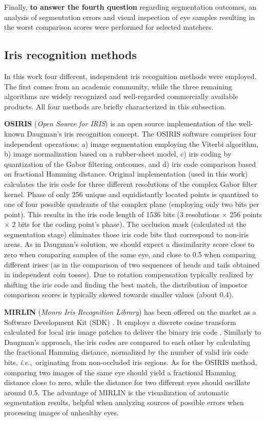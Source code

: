 \documentclass[article,12pt]{elsarticle}
\newcommand{\ie}{{\it i.e.},~}
\begin{document}
Finally, \textbf{to answer the fourth question} regarding segmentation outcomes, an analysis of segmentation errors and visual inspection of eye samples resulting in the worst comparison scores were performed for selected matchers. 


\subsection{Iris recognition methods} 
\label{methods}

In this work four different, independent iris recognition methods were employed. The first comes from an academic community, while the three remaining algorithms are widely recognized and well-regarded commercially available products. All four methods are briefly characterized in this subsection.

\textbf{OSIRIS} ({\it Open Source for IRIS}) \cite{OSIRIS} is an open source implementation of the well-known Daugman’s iris recognition concept. The OSIRIS software comprises four independent operations: a) image segmentation employing the Viterbi algorithm, b) image normalization based on a rubber-sheet model, c) iris coding by quantization of the Gabor filtering outcomes, and d) iris code comparison based on fractional Hamming distance. Original implementation (used in this work) calculates the iris code for three different resolutions of the complex Gabor filter kernel. Phase of only 256 unique and equidistantly located points is quantized to one of four possible quadrants of the complex plane (employing only two bits per point). This results in the iris code length of 1536 bits (3 resolutions $\times$ 256 points $\times$ 2 bits for the coding point’s phase). The occlusion mask (calculated at the segmentation stage) eliminates those iris code bits that correspond to non-iris areas. As in Daugman’s solution, we should expect a dissimilarity score close to zero when comparing samples of the same eye, and close to 0.5 when comparing different irises (as in the comparison of two sequences of heads and tails obtained in independent coin tosses). Due to rotation compensation typically realized by shifting the iris code and finding the best match, the distribution of impostor comparison scores is typically skewed towards smaller values (about 0.4).

\textbf{MIRLIN} ({\it Monro Iris Recognition Library}) has been offered on the market as a Software Development Kit (SDK) \cite{MIRLIN}. It employs a discrete cosine transform calculated for local iris image patches to deliver the binary iris code \cite{Monro2007}. Similarly to Daugman's approach, the iris codes are compared to each other by calculating the fractional Hamming distance, normalized by the number of valid iris code bits, \ie originating from non-occluded iris regions. As for the OSIRIS method, comparing two images of the same eye should yield a fractional Hamming distance close to zero, while the distance for two different eyes should oscillate around 0.5. The advantage of MIRLIN is the visualization of automatic segmentation results, helpful when analyzing sources of possible errors when processing images of unhealthy eyes.
\end{document}
